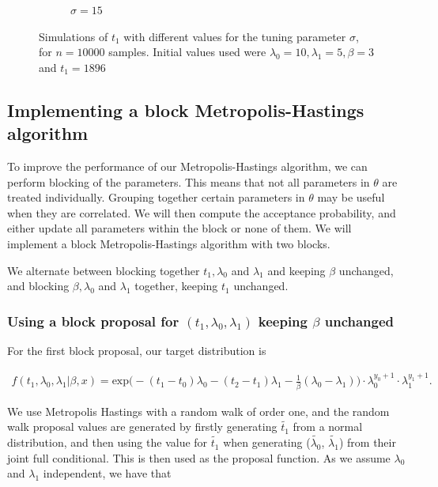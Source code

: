 \begin{figure}[h]
\begin{subfigure}[b]{0.49\textwidth}
        \caption{$\sigma = 15$}
        \label{fig:tuning_single_15}
    \end{subfigure}
    \caption{Simulations of $t_1$ with different values for the tuning parameter $\sigma$, for $n = 10000$ samples. Initial values used were $\lambda_0 = 10, \lambda_1 = 5, \beta = 3$ and $t_1 = 1896$}
    \label{fig:tuning_t_single}
\end{figure}




\subsection{Implementing a block Metropolis-Hastings algorithm}

To improve the performance of our Metropolis-Hastings algorithm, we can perform blocking of the parameters. This means that not all parameters in $\theta$ are treated individually. Grouping together certain parameters in $\theta$ may be useful when they are correlated. We will then compute the acceptance probability, and either update all parameters within the block or none of them. We will implement a block Metropolis-Hastings algorithm with two blocks.


We alternate between blocking together $t_1, \lambda_0$ and  $ \lambda_1$ and keeping $\beta$ unchanged, and blocking $\beta, \lambda_0$ and $\lambda_1$ together, keeping $t_1$ unchanged.


\subsubsection{Using a block proposal for $(t_1, \lambda_0, \lambda_1)$ keeping $\beta$ unchanged}


For the first block proposal, our target distribution is

\begin{align}
    f(t_1, \lambda_0, \lambda_1|\beta, x) = \text{exp} \Big( -(t_1-t_0)\lambda_0 -(t_2-t_1)\lambda_1 - \frac{1}{\beta}(\lambda_0 - \lambda_1)\Big) \cdot\lambda_0^{y_0 + 1} \cdot \lambda_1^{y_1 + 1}.
\end{align}

We use Metropolis Hastings with a random walk of order one, and the random walk proposal values are generated by firstly generating $\widetilde{t_1}$ from a normal distribution, and then using the value for $\widetilde{t_1}$ when generating ($\widetilde{\lambda_0}$, $\widetilde{\lambda_1}$) from their joint full conditional. This is then used as the proposal function. As we assume $\lambda_0$ and $\lambda_1$ independent, we have that 

